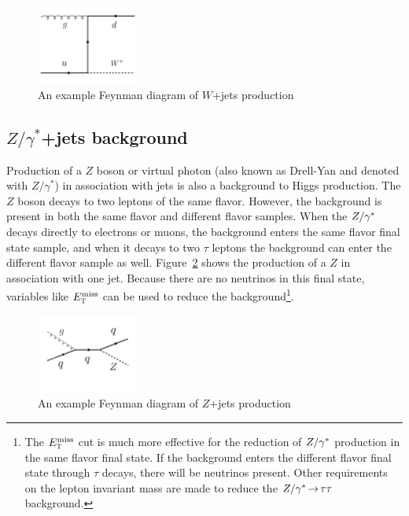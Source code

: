\begin{figure}[h!]
  \centering
  \captionsetup{justification=centering}

  \includegraphics[width=0.3\textwidth]{figures/Feyn_W}
  \caption{An example Feynman diagram of $W$+jets production}
  \label{fig:Wdiagram}
\end{figure}

\subsection{$Z/\gamma^{*}$+jets background}

Production of a $Z$ boson or virtual photon (also known as Drell-Yan and denoted with $Z/\gamma^{*}$) in association with jets is also a background to Higgs production. The $Z$ boson decays to two leptons of the same flavor. However, the background is present in both the same flavor and different flavor samples. When the $Z/\gamma^{\ast}$ decays directly to electrons or muons, the background enters the same flavor final state sample, and when it decays to two $\tau$ leptons the background can enter the different flavor sample as well. Figure~\ref{fig:Zdiagram} shows the production of a $Z$ in association with one jet. Because there are no neutrinos in this final state, variables like $E_{\textrm{\footnotesize\sc t}}^{\rm miss}$ can be used to reduce the background\footnote{The $E_{\textrm{\footnotesize\sc t}}^{\rm miss}$ cut is much more effective for the reduction of $Z/\gamma^{\ast}$ production in the same flavor final state. If the background enters the different flavor final state through $\tau$ decays, there will be neutrinos present. Other requirements on the lepton invariant mass are made to reduce the $Z/\gamma^{\ast} \,{\rightarrow}\, \tau\tau$ background.}. 

\begin{figure}[h!]
  \centering
  \captionsetup{justification=centering}

  \includegraphics[width=0.3\textwidth]{figures/Feyn_Zjets}
  \caption{An example Feynman diagram of $Z$+jets production}
  \label{fig:Zdiagram}
\end{figure}

